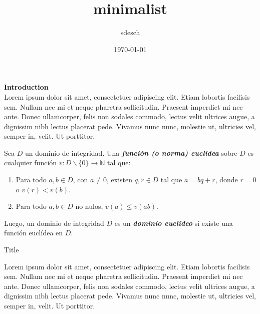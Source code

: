 \documentclass{beamer}
\title{minimalist}
\author{sdesch}
\date{\today}
\begin{document}


\begin{frame}[plain]
    \begingroup
        \selectfont
        \Huge\color{black}\textbf{Introduction}\\[0.6em]
    \endgroup
    \begingroup
        Lorem ipsum dolor sit amet, consectetuer adipiscing elit.
        Etiam lobortis facilisis sem. Nullam nec mi et neque
        pharetra sollicitudin. Praesent imperdiet mi nec ante. Donec
        ullamcorper, felis non sodales commodo, lectus velit ultrices
        augue, a dignissim nibh lectus placerat pede. Vivamus nunc
        nunc, molestie ut, ultricies vel, semper in, velit. Ut porttitor.
    \endgroup
\end{frame}


\begin{frame}[plain]
    \begin{bee}[Definición]
        Sea $D$ un dominio de integridad. Una \textbf{\textit{función (o norma) euclídea}} sobre $D$ es cualquier función $v:D\backslash\{0\}\rightarrow\mathbb{N}$ tal que:
            \begin{enumerate}[1)]
                \item Para todo $a,b\in D$, con $a\neq 0$, existen $q,r\in D$ tal que $a=bq+r$, donde $r=0$ o $v(r)<v(b)$.
                \item Para todo $a,b\in D$ no nulos, $v(a)\leq v(ab)$.
            \end{enumerate}
        Luego, un dominio de integridad $D$ es un \textbf{\textit{dominio euclídeo}} si existe una función euclídea en $D$.
    \end{bee} 
\end{frame}

\begin{frame}{Title}
    \begin{bee}[]
        Lorem ipsum dolor sit amet, consectetuer adipiscing elit.
        Etiam lobortis facilisis sem. Nullam nec mi et neque
        pharetra sollicitudin. Praesent imperdiet mi nec ante. Donec
        ullamcorper, felis non sodales commodo, lectus velit ultrices
        augue, a dignissim nibh lectus placerat pede. Vivamus nunc
        nunc, molestie ut, ultricies vel, semper in, velit. Ut porttitor.
    \end{bee}
\end{frame}
\end{document}
